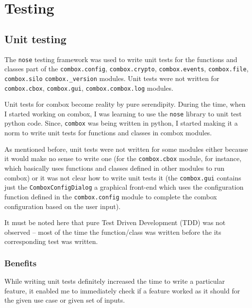\chapter{Testing}

\section{Unit testing}

The \verb+nose+\cite{pylib:nose} testing framework was used to
write unit tests for the functions and classes part of the
\verb+combox.config+, \verb+combox.crypto+, \verb+combox.events+,
\verb+combox.file+, \verb+combox.silo+ \verb+combox._version+
modules. Unit tests were not written for \verb+combox.cbox+,
\verb+combox.gui+, \verb+combox.combox.log+ modules.

Unit tests for combox become reality by pure serendipity. During the
time, when I started working on combox, I was learning to use the
\verb+nose+ library to unit test python code. Since, \verb+combox+ was
being written in python, I started making it a norm to write unit
tests for functions and classes in combox modules.

As mentioned before, unit tests were not written for some modules
either because it would make no sense to write one (for the
\verb+combox.cbox+ module, for instance, which basically uses
functions and classes defined in other modules to run combox) or it
was not clear how to write unit tests it (the \verb+combox.gui+
contains just the \verb+ComboxConfigDialog+ a graphical front-end
which uses the configuration function defined in the
\verb+combox.config+ module to complete the combox configuration based
on the user input).

It must be noted here that pure Test Driven Development (TDD) was not
observed -- most of the time the function/class was written before the
its corresponding test was written.

\subsection{Benefits}

While writing unit tests definitely increased the time to write a
particular feature, it enabled me to immediately check if a feature
worked as it should for the given use case or given set of inputs.

